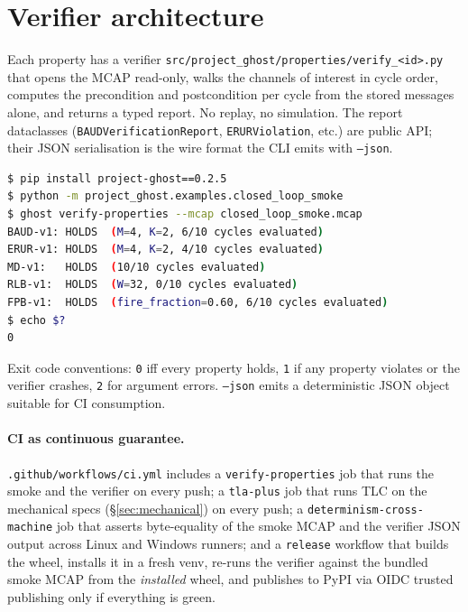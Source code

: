 \documentclass[acmsmall,nonacm=true,review=false]{acmart}
\theoremstyle{plain}
\begin{document}
\section{Verifier architecture}
\label{sec:verifier}

Each property has a verifier
\texttt{src/project\_ghost/properties/verify\_<id>.py} that opens the
MCAP read-only, walks the channels of interest in cycle order,
computes the precondition and postcondition per cycle from the
stored messages alone, and returns a typed report. No replay, no
simulation. The report dataclasses
(\texttt{BAUDVerificationReport}, \texttt{ERURViolation}, etc.) are
public API; their JSON serialisation is the wire format the CLI
emits with \texttt{--json}.

\begin{lstlisting}[language=bash]
$ pip install project-ghost==0.2.5
$ python -m project_ghost.examples.closed_loop_smoke
$ ghost verify-properties --mcap closed_loop_smoke.mcap
BAUD-v1: HOLDS  (M=4, K=2, 6/10 cycles evaluated)
ERUR-v1: HOLDS  (M=4, K=2, 4/10 cycles evaluated)
MD-v1:   HOLDS  (10/10 cycles evaluated)
RLB-v1:  HOLDS  (W=32, 0/10 cycles evaluated)
FPB-v1:  HOLDS  (fire_fraction=0.60, 6/10 cycles evaluated)
$ echo $?
0
\end{lstlisting}

Exit code conventions: \texttt{0} iff every property holds, \texttt{1}
if any property violates or the verifier crashes, \texttt{2} for
argument errors. \texttt{--json} emits a deterministic JSON object
suitable for CI consumption.

\paragraph{CI as continuous guarantee.}
\texttt{.github/workflows/ci.yml} includes a
\texttt{verify-properties} job that runs the smoke and the verifier
on every push; a \texttt{tla-plus} job that runs TLC on the
mechanical specs (\S\ref{sec:mechanical}) on every push; a
\texttt{determinism-cross-machine} job that asserts byte-equality of
the smoke MCAP and the verifier JSON output across Linux and Windows
runners; and a \texttt{release} workflow that builds the wheel,
installs it in a fresh venv, re-runs the verifier against the
bundled smoke MCAP from the \emph{installed} wheel, and publishes
to PyPI via OIDC trusted publishing only if everything is green.

\end{document}
